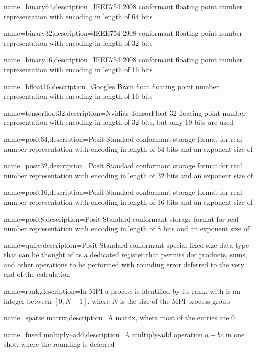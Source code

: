 
    {name=binary64,description={IEEE754 2008 \cite{ieee754_2008} conformant floating point number representation with encoding in length of \num{64} bits}}

    {name=binary32,description={IEEE754 2008 \cite{ieee754_2008} conformant floating point number representation with encoding in length of \num{32} bits}}

    {name=binary16,description={IEEE754 2008 \cite{ieee754_2008} conformant floating point number representation with encoding in length of \num{16} bits}}

    {name=bfloat16,description={Googles Brain float \cite{bfloat16} floating point number representation with encoding in length of \num{16} bits}}

    {name=tensorfloat32,description={Nvidias TensorFloat-32 \cite{tf32} floating point number representation with encoding in length of \num{32} bits, but only \num{19} bits are used}}

    {name=posit64,description={Posit Standard \cite{posit2018standard} conformant storage format for real number representation with encoding in length of \num{64} bits and an exponent size of }}

    {name=posit32,description={Posit Standard \cite{posit2018standard} conformant storage format for real number representation with encoding in length of \num{32} bits and an exponent size of }}

    {name=posit16,description={Posit Standard \cite{posit2018standard} conformant storage format for real number representation with encoding in length of \num{16} bits and an exponent size of }}

    {name=posit8,description={Posit Standard \cite{posit2018standard} conformant storage format for real number representation with encoding in length of \num{8} bits and an exponent size of }}

    {name=quire,description={Posit Standard \cite{posit2018standard} conformant special fixed-size data type that can be thought of as a dedicated register that permits dot products, sums, and other operations to be performed with rounding error deferred to the very end of the calculation \cite{gustafson2017}}}

    {name=rank,description={In \acrshort{MPI} a process is identified by its rank, with is an integer between $[0, N-1]$, where $N$ is the size of the MPI process group}}

    {name=sparse matrix,description={A matrix, where most of the entries are \num{0}}}

    {name=fused multiply–add,description={A multiply-add operation $a + bc$ in one shot, where the rounding is deferred}}

